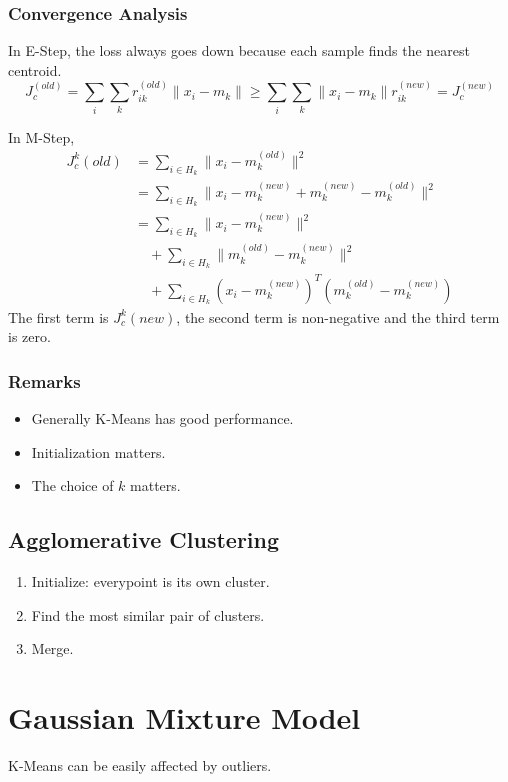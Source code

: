 \subsubsection{Convergence Analysis}
In E-Step, the loss always goes down because each sample finds the nearest centroid.
\[ J_c^{(old)} = \sum_i\sum_kr_{ik}^{(old)}\|x_i-m_k\| \ge \sum_i\sum_k\|x_i-m_k\|r_{ik}^{(new)} = J_c^{(new)} \]

In M-Step,
\begin{align*}
    J_c^k(old) & = \sum_{i\in H_k}\|x_i - m_k^{(old)}\|^2                               \\
               & = \sum_{i\in H_k}\| x_i - m_k^{(new)} + m_k^{(new)} - m_k^{(old)} \|^2 \\
               & = \sum_{i\in H_k} \|x_i - m_k^{(new)}\|^2                              \\
               & \quad + \sum_{i\in H_k}\|m_k^{(old)} - m_k^{(new)}\|^2                 \\
               & \quad + \sum_{i\in H_k}(x_i-m_k^{(new)})^T(m_k^{(old)}-m_k^{(new)})
\end{align*}
The first term is $J_c^k(new)$, the second term is non-negative and the third term is zero.

\subsubsection{Remarks}
\begin{itemize}
    \item Generally K-Means has good performance.
    \item Initialization matters.
    \item The choice of $k$ matters.
\end{itemize}

\subsection{Agglomerative Clustering}
\begin{enumerate}
    \item Initialize: everypoint is its own cluster.
    \item Find the most similar pair of clusters.
    \item Merge.
\end{enumerate}


\section{Gaussian Mixture Model}
    K-Means can be easily affected by outliers.

